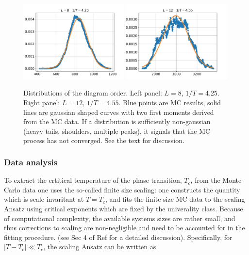 \begin{figure}
\includegraphics[width=0.49\textwidth, keepaspectratio=True]{nmnm_m52L8b425.pdf}
\includegraphics[width=0.49\textwidth, keepaspectratio=True]{nmnm_m52L12b455.pdf}
%
\caption{Distributions of the diagram order. Left panel: $L=8$, $1/T = 4.25$.
Right panel: $L=12$, $1/T = 4.55$. Blue points are MC results, solid lines
are gaussian shaped curves with two first moments derived from the MC data.
If a distribution is sufficiently non-gaussian (heavy tails, shoulders,
multiple peaks), it signals that the MC process has not converged. See the text
for discussion.
\label{fig:nmnm}
}
\end{figure}



\subsubsection{Data analysis}

To extract the crtitical temperature of the phase transition, $T_c$, from the Monte Carlo
data one uses the so-called finite size scaling: one constructs the quantity which
is scale invaritant at $T = T_c$, and fits the finite size MC data to the scaling
Ansatz using critical exponents which are fixed by the univerality class.
Because of computational complexity, the available systems sizes are rather small,
and thus corrections to scaling are non-negligible and need to be accounted for
in the fitting procedure. (see Sec 4 of Ref \cite{NJP:2006} for a detailed discussion).
Specifically, for $|T - T_c| \ll T_c$, the scaling Ansatz can be written as

